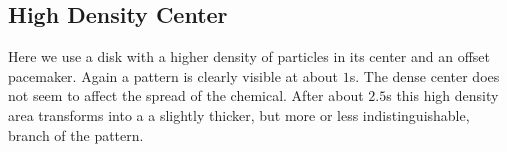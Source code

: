 \begin{minipage}{0.45\textwidth}
\subsection{High Density Center}
Here we use a disk with a higher density of particles in its center and an offset pacemaker.
Again a pattern is clearly visible at about $1$s.
The dense center does not seem to affect the spread of the chemical.
After about $2.5$s this high density area transforms into a a slightly thicker, but more or less indistinguishable, branch of the pattern.
\end{minipage}